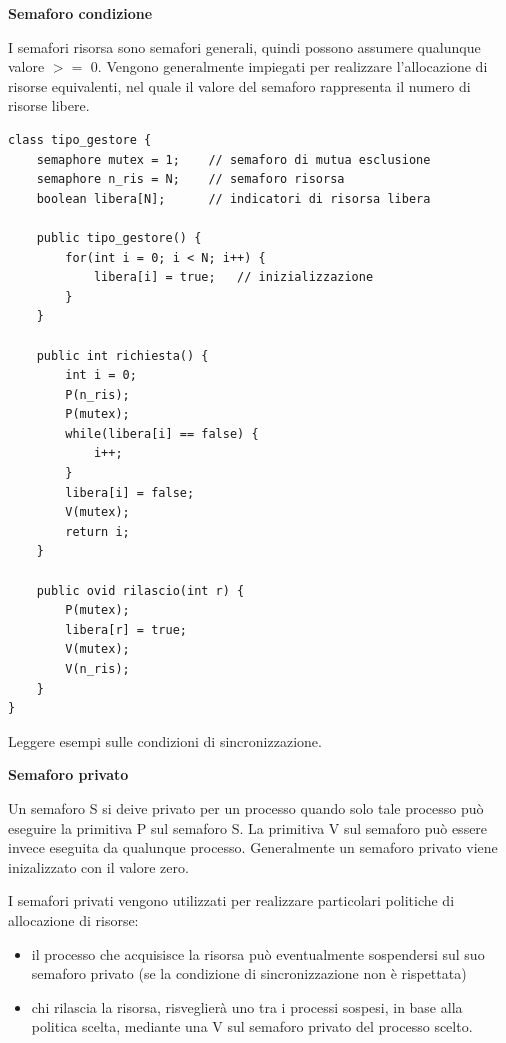 \documentclass{article}
\begin{document}
\vspace{5mm}
\textbf{Semaforo condizione}

\vspace{3mm}
I semafori risorsa sono semafori generali, quindi possono assumere qualunque valore $>=$ 0. Vengono generalmente impiegati per realizzare l'allocazione di risorse
equivalenti, nel quale il valore del semaforo rappresenta il numero di risorse libere.

\vspace{3mm}
\begin{lstlisting}
class tipo_gestore {
    semaphore mutex = 1;    // semaforo di mutua esclusione
    semaphore n_ris = N;    // semaforo risorsa
    boolean libera[N];      // indicatori di risorsa libera

    public tipo_gestore() {
        for(int i = 0; i < N; i++) {
            libera[i] = true;   // inizializzazione
        }
    }

    public int richiesta() {
        int i = 0;
        P(n_ris);
        P(mutex);
        while(libera[i] == false) {
            i++;
        }
        libera[i] = false;
        V(mutex);
        return i;
    }

    public ovid rilascio(int r) {
        P(mutex);
        libera[r] = true;
        V(mutex);
        V(n_ris);
    }
}
\end{lstlisting}

\vspace{3mm}
Leggere esempi sulle condizioni di sincronizzazione.

\vspace{5mm}
\textbf{Semaforo privato}

\vspace{3mm}
Un semaforo S si deive privato per un processo quando solo tale processo può eseguire la primitiva P sul semaforo S. La primitiva V sul semaforo può essere invece eseguita
da qualunque processo. Generalmente un semaforo privato viene inizalizzato con il valore zero.

\vspace{3mm}
I semafori privati vengono utilizzati per realizzare particolari politiche di allocazione di risorse:
\begin{itemize}
    \item il processo che acquisisce la risorsa può eventualmente sospendersi sul suo semaforo privato (se la condizione di sincronizzazione non è rispettata)
    \item chi rilascia la risorsa, risveglierà uno tra i processi sospesi, in base alla politica scelta, mediante una V sul semaforo privato del processo scelto.
\end{itemize}
\end{document}
